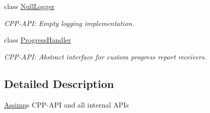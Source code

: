 \begin{DoxyCompactItemize}
class \hyperlink{class_assimp_1_1_null_logger}{Null\+Logger}
\begin{DoxyCompactList}\small\item\em C\+P\+P-\/\+A\+PI\+: Empty logging implementation. \end{DoxyCompactList}\item 
class \hyperlink{class_assimp_1_1_progress_handler}{Progress\+Handler}
\begin{DoxyCompactList}\small\item\em C\+P\+P-\/\+A\+PI\+: Abstract interface for custom progress report receivers. \end{DoxyCompactList}\end{DoxyCompactItemize}


\subsection{Detailed Description}
\hyperlink{namespace_assimp}{Assimp}\textquotesingle{}s C\+P\+P-\/\+A\+PI and all internal A\+P\+Is 